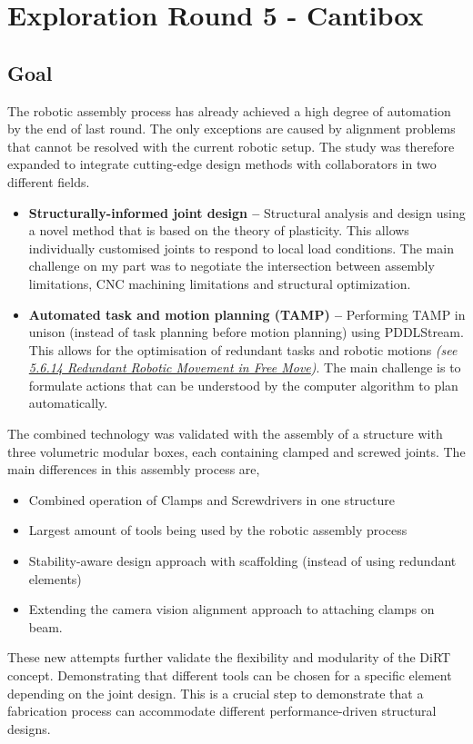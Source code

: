 \chapter{Exploration Round 5 - Cantibox}
\label{chapter:exploration_round_5}

\section{Goal}
\label{section:exploration_5_goal}

The robotic assembly process has already achieved a high degree of automation by the end of last round. The only exceptions are caused by alignment problems that cannot be resolved with the current robotic setup. The study was therefore expanded to integrate cutting-edge design methods with collaborators in two different fields. 

\begin{itemize}
	\item \textbf{Structurally-informed joint design --} Structural analysis and design using a novel method that is based on the theory of plasticity. This allows individually customised joints to respond to local load conditions. The main challenge on my part was to negotiate the intersection between assembly limitations, CNC machining limitations and structural optimization. 

	\item \textbf{Automated task and motion planning (TAMP) --} Performing TAMP in unison (instead of task planning before motion planning) using PDDLStream. This allows for the optimisation of redundant tasks and robotic motions \textit{(see \ul{5.6.14 Redundant Robotic Movement in Free Move})}. The main challenge is to formulate actions that can be understood by the computer algorithm to plan automatically. 

\end{itemize}
The combined technology was validated with the assembly of a structure with three volumetric modular boxes, each containing clamped and screwed joints. The main differences in this assembly process are,

\begin{itemize}
	\item Combined operation of Clamps and Screwdrivers in one structure

	\item Largest amount of tools being used by the robotic assembly process

	\item Stability-aware design approach with scaffolding (instead of using redundant elements)

	\item Extending the camera vision alignment approach to attaching clamps on beam.

\end{itemize}
These new attempts further validate the flexibility and modularity of the DiRT concept. Demonstrating that different tools can be chosen for a specific element depending on the joint design. This is a crucial step to demonstrate that a fabrication process can accommodate different performance-driven structural designs.  

